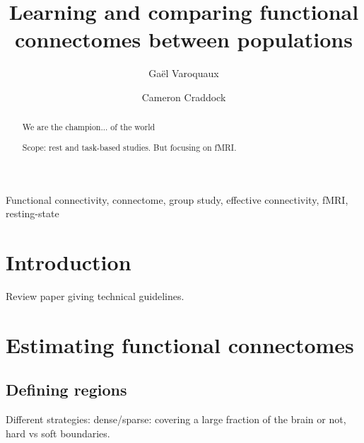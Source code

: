 \documentclass[5p]{elsarticle}
\begin{document}
\title{Learning and comparing functional connectomes between populations}


\author[parietal,unicog,cea]{Ga\"el Varoquaux}
\author[child_institute]{Cameron Craddock}


\address[parietal]{Parietal project-team, INRIA Saclay-\^ile de France}
\address[unicog]{INSERM, U992}
\address[cea]{CEA/Neurospin b\^at 145, 91191 Gif-Sur-Yvette}
\address[child_institute]{Child Institute, New York}

\begin{abstract}
    We are the champion... of the world

    Scope: rest and task-based studies. But focusing on fMRI.
\end{abstract}

\begin{keyword}
    Functional connectivity, connectome, group study, effective
    connectivity, fMRI, resting-state
\end{keyword}

\maketitle

\sloppy %
\section{Introduction}

Review paper giving technical guidelines.


\section{Estimating functional connectomes}

\subsection{Defining regions}

Different strategies: 
dense/sparse: covering a large fraction of the
brain or not, hard vs soft boundaries.
\end{document}
